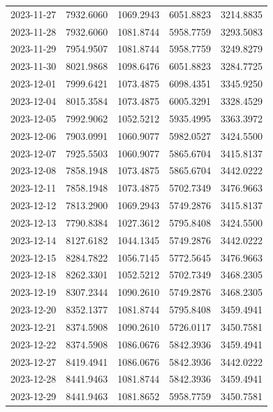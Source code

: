 \begin{footnotesize}
\begin{longtable}{lllll}
2023-11-27 & 7932.6060 & 1069.2943 & 6051.8823 & 3214.8835 \\
2023-11-28 & 7932.6060 & 1081.8744 & 5958.7759 & 3293.5083 \\
2023-11-29 & 7954.9507 & 1081.8744 & 5958.7759 & 3249.8279 \\
2023-11-30 & 8021.9868 & 1098.6476 & 6051.8823 & 3284.7725 \\
2023-12-01 & 7999.6421 & 1073.4875 & 6098.4351 & 3345.9250 \\
2023-12-04 & 8015.3584 & 1073.4875 & 6005.3291 & 3328.4529 \\
2023-12-05 & 7992.9062 & 1052.5212 & 5935.4995 & 3363.3972 \\
2023-12-06 & 7903.0991 & 1060.9077 & 5982.0527 & 3424.5500 \\
2023-12-07 & 7925.5503 & 1060.9077 & 5865.6704 & 3415.8137 \\
2023-12-08 & 7858.1948 & 1073.4875 & 5865.6704 & 3442.0222 \\
2023-12-11 & 7858.1948 & 1073.4875 & 5702.7349 & 3476.9663 \\
2023-12-12 & 7813.2900 & 1069.2943 & 5749.2876 & 3415.8137 \\
2023-12-13 & 7790.8384 & 1027.3612 & 5795.8408 & 3424.5500 \\
2023-12-14 & 8127.6182 & 1044.1345 & 5749.2876 & 3442.0222 \\
2023-12-15 & 8284.7822 & 1056.7145 & 5772.5645 & 3476.9663 \\
2023-12-18 & 8262.3301 & 1052.5212 & 5702.7349 & 3468.2305 \\
2023-12-19 & 8307.2344 & 1090.2610 & 5749.2876 & 3468.2305 \\
2023-12-20 & 8352.1377 & 1081.8744 & 5795.8408 & 3459.4941 \\
2023-12-21 & 8374.5908 & 1090.2610 & 5726.0117 & 3450.7581 \\
2023-12-22 & 8374.5908 & 1086.0676 & 5842.3936 & 3459.4941 \\
2023-12-27 & 8419.4941 & 1086.0676 & 5842.3936 & 3442.0222 \\
2023-12-28 & 8441.9463 & 1081.8744 & 5842.3936 & 3459.4941 \\
2023-12-29 & 8441.9463 & 1081.8652 & 5958.7759 & 3450.7581 \\
\end{longtable}
\end{footnotesize}